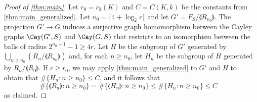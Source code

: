 \begin{proof}[Proof of \cref{thm:main}]
Let $r_0=r_0(K)$ and $C=C(K,k)$ be the constants from \cref{thm:main_generalized}.
Let $n_0=\lceil 4+\log_2 r \rceil$ and let $G'=F_S/\llangle R_{n_0} \rrangle$. The projection $G' \to G$ induces a surjective graph homomorphism between the Cayley graphs $\Cay(G',S)$ and $\Cay(G,S)$ that restricts to an isomorphism between the balls of radius $2^{n_0-1}-1\geq 4r$. Let $H$ be the subgroup of $G'$ generated by $\bigcup_{n\geq n_0} (R_n/\llangle R_{n_0} \rrangle)$ and, for each $n\geq n_0$, let $H_n$ be the subgroup of $H$ generated by $R_n/\llangle R_0 \rrangle$. If $r\geq r_0$, we may apply \cref{thm:main_generalized} to $G'$ and $H$ to obtain that
$\#\{H_n : n \geq n_0\} \leq C$, and it follows that 
\[
\#\{\llangle R_n \rrangle : n \geq n_0\}=\#\{\llangle H_n \rrangle : n \geq n_0\} \leq \#\{H_n : n \geq n_0\} \leq C
\]
as claimed.
\end{proof}
